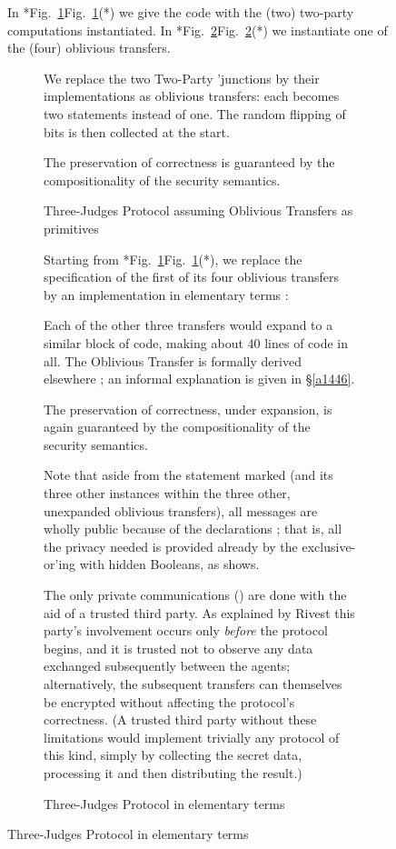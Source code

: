 \documentclass[runningheads]{llncs}
\newcommand\App[1] {App.~\ref{#1}}
\renewcommand\App[1] {\S\ref{#1}}
\newenvironment{Figure}[2][t]{\begin{figure}[#1]\def\Label{#2}\small}{\label{\Label}\end{figure}}
\newcommand\Fig[2][*] {{\def\z{#1}\if*\z Fig.~\ref{#2}\else Fig.~\ref{#2}(#1)\fi}}
\begin{document}
\begin{Figure}[ht!]{f1228}
In \Fig{f1640} we give the code with the (two) two-party computations instantiated. In \Fig{f1641} we instantiate one of the (four) oblivious transfers.
\begin{Figure}{f1640}


We replace the two Two-Party 'junctions by their implementations as oblivious transfers: each becomes two statements instead of one. The random flipping of bits  is then collected at the start.

\medskip
The preservation of correctness is guaranteed by the compositionality of the security semantics.
\caption{Three-Judges Protocol assuming Oblivious Transfers as primitives}
\end{Figure}
\begin{Figure}[ht!]{f1641}
Starting from \Fig{f1640}, we replace the specification of the first of its four oblivious transfers  by an implementation in elementary terms \cite{McIver:09b}:



Each of the other three transfers would expand to a similar block of code, making about 40 lines of code in all. The Oblivious Transfer is formally derived elsewhere \cite{Morgan:07}; an informal explanation is given in \App{a1446}.

\medskip
The preservation of correctness, under expansion, is again guaranteed by the compositionality of the security semantics.

\medskip
Note that aside from the statement marked  (and its three other instances within the three other, unexpanded oblivious transfers), all messages are wholly public because of the declarations ; that is, all the privacy needed is provided already by the exclusive-or'ing with hidden Booleans, as  shows. 

The only private communications () are done with the aid of a trusted third party. As explained by Rivest \cite{Rivest:99,Morgan:07} this party's involvement occurs only \emph{before} the protocol begins, and it is trusted not to observe any data exchanged subsequently between the agents; alternatively, the subsequent transfers can themselves be encrypted without affecting the protocol's correctness. (A trusted third party without these limitations would implement trivially any protocol of this kind, simply by collecting the secret data, processing it and then distributing the result.)

\caption{Three-Judges Protocol in elementary terms}
\end{Figure}



\end{Figure}
\end{document}
